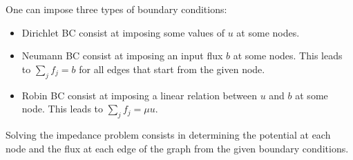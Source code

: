 \documentclass[11pt,a4paper]{article}		%
\begin{document}
One can impose three types of boundary conditions:

\begin{itemize}
	\item Dirichlet BC consist at imposing some values of $u$ at some nodes.
	\item Neumann BC consist at imposing an input flux $b$ at some nodes. This leads to $\sum_j f_j = b$ for all edges that start from the given node.
	\item Robin BC consist at imposing a linear relation between $u$ and $b$ at some node. This leads to $\sum_j f_j = \mu u$.
\end{itemize}


Solving the impedance problem consists in determining the potential at each node and the flux at each edge of the graph from the given boundary conditions.

\end{document}
